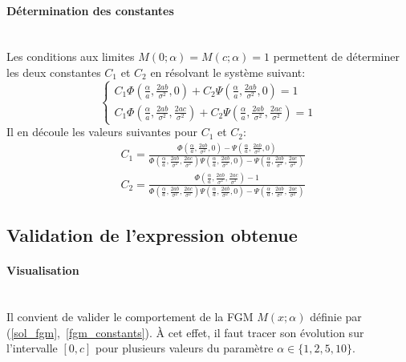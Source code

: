 \paragraph{Détermination des constantes}\phantom{}\\
Les conditions aux limites $M(0;\alpha)=M(c;\alpha)=1$ permettent de déterminer les deux constantes $C_1$ et $C_2$ en résolvant le système suivant:
\[
\begin{cases}
    C_1\Phi\left(\frac{\alpha}{a}, \frac{2ab}{\sigma^2}, 0\right) + C_2\Psi\left(\frac{\alpha}{a}, \frac{2ab}{\sigma^2}, 0\right) = 1 \\
C_1\Phi\left(\frac{\alpha}{a}, \frac{2ab}{\sigma^2}, \frac{2ac}{\sigma^2}\right) + C_2\Psi\left(\frac{\alpha}{a}, \frac{2ab}{\sigma^2}, \frac{2ac}{\sigma^2}\right) = 1
\end{cases}
\]
Il en découle les valeurs suivantes pour $C_1$ et $C_2$: 
\begin{equation}\label{fgm_constants}
    \begin{aligned}
        &C_1 = \frac{\Phi(\frac{\alpha}{a}, \frac{2ab}{\sigma^2}, 0)-\Psi(\frac{\alpha}{a}, \frac{2ab}{\sigma^2}, 0)}{\Phi(\frac{\alpha}{a}, \frac{2ab}{\sigma^2}, \frac{2ac}{\sigma^2})\Psi(\frac{\alpha}{a}, \frac{2ab}{\sigma^2}, 0)-\Psi(\frac{\alpha}{a}, \frac{2ab}{\sigma^2}, \frac{2ac}{\sigma^2})} \\
        &C_2 = \frac{\Phi(\frac{\alpha}{a}, \frac{2ab}{\sigma^2}, \frac{2ac}{\sigma^2})-1}{\Phi(\frac{\alpha}{a}, \frac{2ab}{\sigma^2}, \frac{2ac}{\sigma^2})\Psi(\frac{\alpha}{a}, \frac{2ab}{\sigma^2}, 0)-\Psi(\frac{\alpha}{a}, \frac{2ab}{\sigma^2}, \frac{2ac}{\sigma^2})}
    \end{aligned}
\end{equation}
\subsection{Validation de l'expression obtenue}
\paragraph{Visualisation}\phantom{}\\
Il convient de valider le comportement de la \acl{FGM} $M(x;\alpha)$ définie par (\ref{sol_fgm},~\ref{fgm_constants}). À cet effet, il faut tracer son évolution sur l'intervalle $[0, c]$ pour plusieurs valeurs du paramètre $\alpha \in \{1, 2, 5, 10\}$. 


